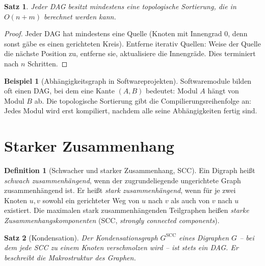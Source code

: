 ﻿\documentclass[a4paper,12pt,openany,oneside]{book}
\theoremstyle{definition}
\newtheorem{definition}{Definition}[chapter]
\newtheorem{beispiel}{Beispiel}[chapter]
\theoremstyle{plain}
\newtheorem{satz}{Satz}[chapter]
\theoremstyle{remark}
\begin{document}
\begin{satz}
  Jeder DAG besitzt mindestens eine topologische Sortierung, die in
  $O(n+m)$ berechnet werden kann.
\end{satz}

\begin{proof}
  Jeder DAG hat mindestens eine Quelle (Knoten mit Innengrad 0, denn
  sonst g\"abe es einen gerichteten Kreis). Entferne iterativ Quellen:
  Weise der Quelle die n\"achste Position zu, entferne sie, aktualisiere
  die Innengr\"ade. Dies terminiert nach $n$ Schritten.
\end{proof}

\begin{beispiel}[Abh\"angigkeitsgraph in Softwareprojekten]
  Softwaremodule bilden oft einen DAG, bei dem eine Kante $(A,B)$ bedeutet:
  Modul $A$ h\"angt von Modul $B$ ab. Die topologische Sortierung gibt
  die Compilierungsreihenfolge an: Jedes Modul wird erst kompiliert,
  nachdem alle seine Abh\"angigkeiten fertig sind.
\end{beispiel}

\section{Starker Zusammenhang}

\begin{definition}[Schwacher und starker Zusammenhang, SCC]
  Ein Digraph hei\ss{}t \emph{schwach zusammenh\"angend}, wenn der
  zugrundeliegende ungerichtete Graph zusammenh\"angend ist.
  Er hei\ss{}t \emph{stark zusammenh\"angend}, wenn f\"ur je zwei Knoten
  $u, v$ sowohl ein gerichteter Weg von $u$ nach $v$ als auch von $v$
  nach $u$ existiert. Die maximalen stark zusammenh\"angenden Teilgraphen
  hei\ss{}en \emph{starke Zusammenhangskomponenten} (SCC, \emph{strongly
  connected components}).
\end{definition}

\begin{satz}[Kondensation]
  Der \emph{Kondensationsgraph} $G^{\mathrm{SCC}}$ eines Digraphen $G$
  -- bei dem jede SCC zu einem Knoten verschmolzen wird -- ist stets ein
  DAG. Er beschreibt die Makrostruktur des Graphen.
\end{satz}
\end{document}
